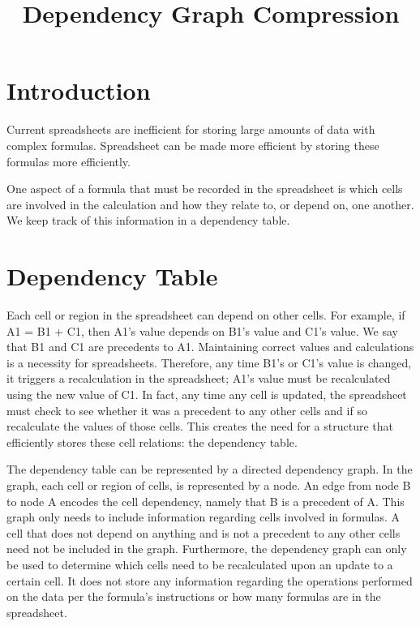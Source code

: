 \documentclass[11pt]{article}
\title{{\LARGE \sc Dependency Graph Compression}}
\author{}
\date{}
\begin{document}
\maketitle
\thispagestyle{empty}

\section{Introduction}
Current spreadsheets are inefficient for storing large amounts of data with complex formulas. Spreadsheet can be made more efficient by storing these formulas more efficiently.

One aspect of a formula that must be recorded in the spreadsheet is which cells are involved in the calculation and how they relate to, or depend on, one another. We keep track of this information in a dependency table.

\section{Dependency Table}

Each cell or region in the spreadsheet can depend on other cells. For example, if A1 = B1 + C1, then A1’s value depends on B1’s value and C1’s value. We say that B1 and C1 are precedents to A1. Maintaining correct values and calculations is a necessity for spreadsheets. Therefore, any time B1’s or C1’s value is changed, it triggers a recalculation in the spreadsheet; A1’s value must be recalculated using the new value of C1. In fact, any time any cell is updated, the spreadsheet must check to see whether it was a precedent to any other cells and if so recalculate the values of those cells. This creates the need for a structure that efficiently stores these cell relations: the dependency table.

The dependency table can be represented by a directed dependency graph. In the graph, each cell or region of cells, is represented by a node. An edge from node B to node A encodes the cell dependency, namely that B is a precedent of A. This graph only needs to include information regarding cells involved in formulas. A cell that does not depend on anything and is not a precedent to any other cells need not be included in the graph. Furthermore, the dependency graph can only be used to determine which cells need to be recalculated upon an update to a certain cell. It does not store any information regarding the operations performed on the data per the formula’s instructions or how many formulas are in the spreadsheet.
\end{document}
